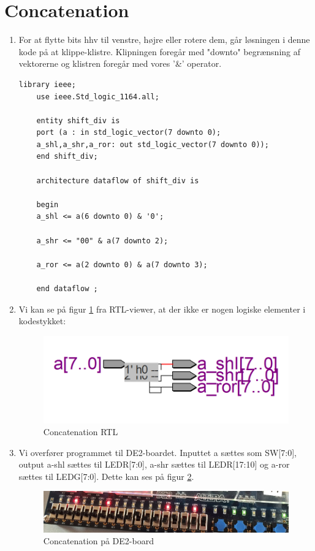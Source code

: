 \newpage
\section{Concatenation}
\begin{enumerate}
	\item[1)]
	For at flytte bits hhv til venstre, højre eller rotere dem, går løsningen i denne kode på at klippe-klistre. Klipningen foregår med "downto" begrænsning af vektorerne og klistren foregår med vores '\&' operator.
		\begin{lstlisting}[caption={Concatenation kode},label={lst:ConcatenationCode}]
	library ieee;
	use ieee.Std_logic_1164.all;
	
	entity shift_div is
	port (a : in std_logic_vector(7 downto 0);
	a_shl,a_shr,a_ror: out std_logic_vector(7 downto 0));
	end shift_div; 
	
	architecture dataflow of shift_div is
	
	begin 
	a_shl <= a(6 downto 0) & '0';
	
	a_shr <= "00" & a(7 downto 2);
	
	a_ror <= a(2 downto 0) & a(7 downto 3);
	
	end dataflow ;
		\end{lstlisting}
	\item[2)]
Vi kan se på figur \ref{fig:concatenationRTL} fra RTL-viewer, at der ikke er nogen logiske elementer i kodestykket:
	\begin{figure}[H]
		\centering
		\includegraphics[scale=0.5]{pictures/Oevelse3/Concatenation_RTL.png}
		\caption{Concatenation RTL}
		\label{fig:concatenationRTL}
	\end{figure}

	
	\item[3)]
Vi overfører programmet til DE2-boardet. Inputtet a sættes som SW[7:0], output a-shl sættes til LEDR[7:0], a-shr sættes til LEDR[17:10] og a-ror sættes til LEDG[7:0]. Dette kan ses på figur \ref{fig:concatenation_DE2board}.

	\begin{figure}[H]
		\centering
		\includegraphics[scale=0.23]{pictures/Oevelse3/Concatenation_DE2board.jpg}
		\caption{Concatenation på DE2-board}
		\label{fig:concatenation_DE2board}
	\end{figure}

\end{enumerate}
\pagebreak